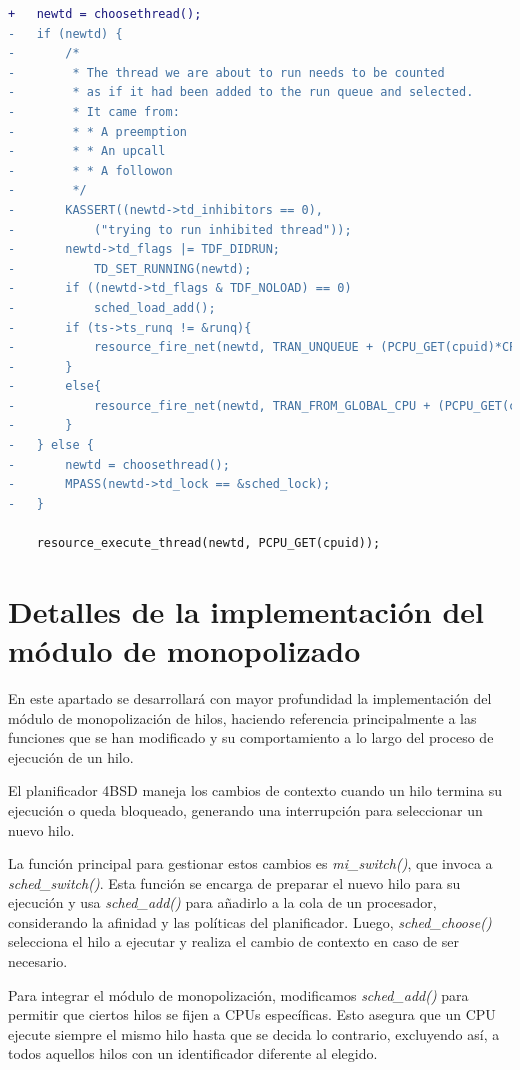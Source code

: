 \begin{lstlisting}[language=diff]
+   newtd = choosethread();
-   if (newtd) {
-       /*
-        * The thread we are about to run needs to be counted
-        * as if it had been added to the run queue and selected.
-        * It came from:
-        * * A preemption
-        * * An upcall
-        * * A followon
-        */
-       KASSERT((newtd->td_inhibitors == 0),
-           ("trying to run inhibited thread"));
-       newtd->td_flags |= TDF_DIDRUN;
-           TD_SET_RUNNING(newtd);
-       if ((newtd->td_flags & TDF_NOLOAD) == 0)
-           sched_load_add();
-       if (ts->ts_runq != &runq){
-           resource_fire_net(newtd, TRAN_UNQUEUE + (PCPU_GET(cpuid)*CPU_BASE_TRANSITIONS));
-       }
-       else{
-           resource_fire_net(newtd, TRAN_FROM_GLOBAL_CPU + (PCPU_GET(cpuid)*CPU_BASE_TRANSITIONS));
-       }
-   } else {
-       newtd = choosethread();
-       MPASS(newtd->td_lock == &sched_lock);
-   }

    resource_execute_thread(newtd, PCPU_GET(cpuid));

\end{lstlisting}

\chapter{Detalles de la implementación del módulo de monopolizado}\label{appendix:apB}

En este apartado se desarrollará con mayor profundidad la implementación del módulo de monopolización de hilos, haciendo referencia principalmente a las funciones que se han modificado y su comportamiento a lo largo del proceso de ejecución de un hilo.

El planificador 4BSD maneja los cambios de contexto cuando un hilo termina su ejecución o queda bloqueado, generando una interrupción para seleccionar un nuevo hilo.

La función principal para gestionar estos cambios es \textit{mi\_switch()}, que invoca a \textit{sched\_switch()}. Esta función se encarga de preparar el nuevo hilo para su ejecución y usa \textit{sched\_add()} para añadirlo a la cola de un procesador, considerando la afinidad y las políticas del planificador. Luego, \textit{sched\_choose()} selecciona el hilo a ejecutar y realiza el cambio de contexto en caso de ser necesario.

Para integrar el módulo de monopolización, modificamos \textit{sched\_add()} para permitir que ciertos hilos se fijen a CPUs específicas. Esto asegura que un CPU ejecute siempre el mismo hilo hasta que se decida lo contrario, excluyendo así, a todos aquellos hilos con un identificador diferente al elegido.

